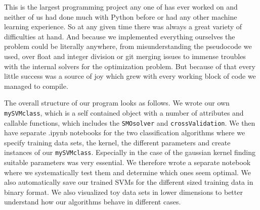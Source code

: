 This is the largest programming project any one of has ever worked on and neither of us had done much with Python before or had any other machine learning experience. So at any given time there was always a great variety of difficulties at hand. And because we implemented everything ourselves the problem could be literally anywhere, from misunderstanding the pseudocode we used, over float and integer division or git merging issues to immense troubles with the internal solvers for the optimization problem. But because of that every little success was a source of joy which grew with every working block of code we managed to compile.

\smallskip
The overall structure of our program looks as follows. We wrote our own \texttt{mySVMclass}, which is a self contained object with a number of attributes and callable functions, which includes the \texttt{SMOsolver} and \texttt{crossValidation}. We then have separate .ipynb notebooks for the two classification algorithms where we specify training data sets, the kernel, the different parameters and create instances of our \texttt{mySVMclass}. Especially in the case of the gaussian kernel finding suitable parameters was very essential. We therefore wrote a separate notebook where we systematically test them and determine which ones seem optimal. We also automatically save our trained SVMs for the different sized training data in binary format. We also visualized toy data sets in lower dimensions to better understand how our algorithms behave in different cases.

